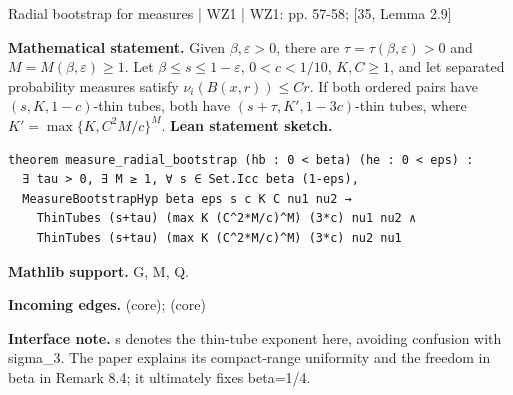 \documentclass[10pt,a4paper]{article}
\newcommand{\nodecard}[1]{\hyperlink{node-#1}{\texttt{\detokenize{#1}}}}
\begin{document}
\begin{minipage}{\linewidth}
\hypertarget{node-P8_6}{}
\begin{tcolorbox}[colback=white,colframe=radialfg,colbacktitle=radialbg,coltitle=ink,boxrule=0.45pt,arc=1.6mm,left=3mm,right=3mm,top=2mm,bottom=2mm,title={\sffamily\bfseries WZ1 Proposition 8.6 \hfill \texttt{P8\_6}}]
{\sffamily\small\color{muted}Radial bootstrap for measures | WZ1 | WZ1: pp. 57-58; [35, Lemma 2.9]}\par
\textbf{Mathematical statement.} Given $\beta,\varepsilon>0$, there are $\tau=\tau(\beta,\varepsilon)>0$ and $M=M(\beta,\varepsilon)\ge1$.
Let $\beta\le s\le1-\varepsilon$, $0<c<1/10$, $K,C\ge1$, and let separated probability measures satisfy $\nu_i(B(x,r))\le Cr$.
If both ordered pairs have $(s,K,1-c)$-thin tubes, both have $(s+\tau,K',1-3c)$-thin tubes, where
$K'=\max\{K,C^2M/c\}^{M}$.
\smallskip\textbf{Lean statement sketch.}
\begin{Verbatim}[fontsize=\small,breaklines=true,breakanywhere=true,tabsize=2]
theorem measure_radial_bootstrap (hb : 0 < beta) (he : 0 < eps) :
  ∃ tau > 0, ∃ M ≥ 1, ∀ s ∈ Set.Icc beta (1-eps),
  MeasureBootstrapHyp beta eps s c K C nu1 nu2 →
    ThinTubes (s+tau) (max K (C^2*M/c)^M) (3*c) nu1 nu2 ∧
    ThinTubes (s+tau) (max K (C^2*M/c)^M) (3*c) nu2 nu1
\end{Verbatim}
{\footnotesize\textbf{Mathlib support.} G, M, Q.\par
\textbf{Incoming edges.} \nodecard{XOSW} (core); \nodecard{Dthin} (core)\par}
{\footnotesize\textbf{Interface note.} s denotes the thin-tube exponent here, avoiding confusion with sigma\_3. The paper explains its compact-range uniformity and the freedom in beta in Remark 8.4; it ultimately fixes beta=1/4.}
\end{tcolorbox}\end{minipage}\par\medskip
\end{document}
